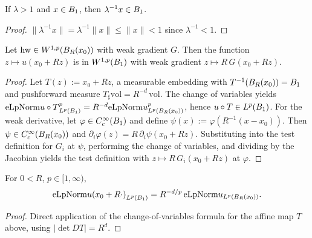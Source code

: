 \begin{lemma}
\label{lem:smul_inv_mem_unitBall}
\leanok
If $\lambda > 1$ and $x \in B_{1}$, then $\lambda^{-1} x \in B_{1}$.
\end{lemma}

\begin{proof}
\leanok

$\|\lambda^{-1}x\| = \lambda^{-1}\|x\| \le \|x\| < 1$ since $\lambda^{-1} < 1$.
\end{proof}

\begin{lemma}
\label{lem:rescale-witness}
\leanok
{}
Let $\mathrm{hw} \in W^{1,p}(B_{R}(x_0))$ with weak gradient $G$. Then the
function $z \mapsto u(x_0 + Rz)$ is in $W^{1,p}(B_{1})$ with weak
gradient $z \mapsto R\,G(x_0 + Rz)$.
\end{lemma}

\begin{proof}
\leanok
{}

Let $T(z) := x_0 + Rz$, a measurable embedding with
$T^{-1}(B_{R}(x_0)) = B_{1}$ and pushforward measure
$T_\sharp \mathrm{vol} = R^{-d}\, \mathrm{vol}$. The change of variables
yields $\mathrm{eLpNorm}{u\circ T}_{L^p(B_{1})}^p = R^{-d}
\mathrm{eLpNorm}{u}_{L^p(B_{R}(x_0))}^p$, hence $u\circ T \in L^p(B_{1})$.
For the weak derivative, let $\varphi \in C^\infty_c(B_{1})$ and define
$\psi(x) := \varphi(R^{-1}(x - x_0))$. Then $\psi \in C^\infty_c(B_{R}(x_0))$
and $\partial_i \varphi(z) = R\, \partial_i \psi(x_0 + Rz)$. Substituting
into the test definition for $G_i$ at $\psi$, performing the change of
variables, and dividing by the Jacobian yields the test definition with
$z \mapsto R\,G_i(x_0+Rz)$ at $\varphi$.
\end{proof}

\begin{lemma}
\label{lem:eLpNorm_rescale_to_unitBall}
\leanok
For $0 < R$, $p \in [1,\infty)$,
\begin{equation*}
\mathrm{eLpNorm}{u(x_0 + R\cdot)}_{L^p(B_{1})}
= R^{-d/p}\,\mathrm{eLpNorm}{u}_{L^p(B_{R}(x_0))}.
\end{equation*}
\end{lemma}

\begin{proof}
\leanok

Direct application of the change-of-variables formula for the affine map
$T$ above, using $|\det DT| = R^d$.
\end{proof}

